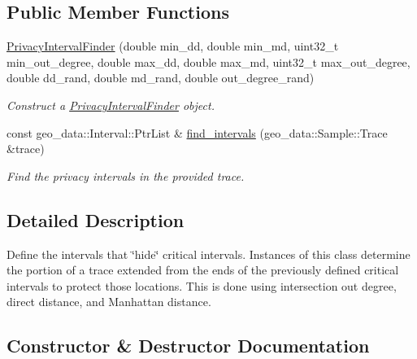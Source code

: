 \subsection*{Public Member Functions}
\begin{DoxyCompactItemize}
\item 
\hyperlink{classcvdi_1_1PrivacyIntervalFinder_ae7041f26e25befc38dc63771c901ff47}{Privacy\+Interval\+Finder} (double min\+\_\+dd, double min\+\_\+md, uint32\+\_\+t min\+\_\+out\+\_\+degree, double max\+\_\+dd, double max\+\_\+md, uint32\+\_\+t max\+\_\+out\+\_\+degree, double dd\+\_\+rand, double md\+\_\+rand, double out\+\_\+degree\+\_\+rand)
\begin{DoxyCompactList}\small\item\em Construct a \hyperlink{classcvdi_1_1PrivacyIntervalFinder}{Privacy\+Interval\+Finder} object. \end{DoxyCompactList}\item 
const geo\+\_\+data\+::\+Interval\+::\+Ptr\+List \& \hyperlink{classcvdi_1_1PrivacyIntervalFinder_af41665ec45983014303ec2124038308e}{find\+\_\+intervals} (geo\+\_\+data\+::\+Sample\+::\+Trace \&trace)
\begin{DoxyCompactList}\small\item\em Find the privacy intervals in the provided trace. \end{DoxyCompactList}\end{DoxyCompactItemize}


\subsection{Detailed Description}
Define the intervals that \char`\"{}hide\char`\"{} critical intervals. Instances of this class determine the portion of a trace extended from the ends of the previously defined critical intervals to protect those locations. This is done using intersection out degree, direct distance, and Manhattan distance. 

\subsection{Constructor \& Destructor Documentation}
